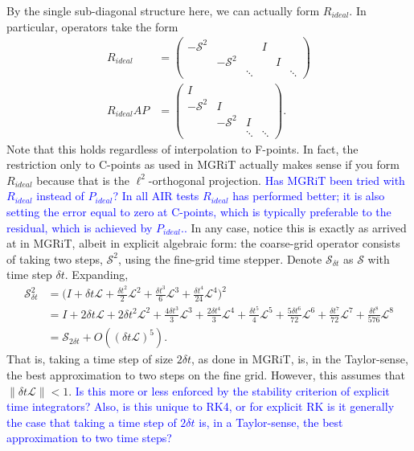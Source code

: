 \documentclass[a4paper,12pt]{article}
\newcommand{\tcb}{\textcolor{blue}}
\begin{document}
By the single sub-diagonal structure here, we can actually form $R_{ideal}$. In particular, operators take the form
%
\begin{align*}
R_{ideal} & = \begin{pmatrix}-\mathcal{S}^2 & & & I & \\ & -\mathcal{S}^2 & & & I \\ & & \ddots & & & \ddots\end{pmatrix} \\
R_{ideal}AP & = \begin{pmatrix} I \\ -\mathcal{S}^2 & I \\ & -\mathcal{S}^2 & I \\ & & \ddots & \ddots \end{pmatrix}.
\end{align*}
%
Note that this holds regardless of interpolation to F-points. In fact, the restriction only to C-points as used in MGRiT actually makes
sense if you form $R_{ideal}$ because that is the $\ell^2$-orthogonal projection. \tcb{Has MGRiT been tried with $R_{ideal}$ instead
of $P_{ideal}$? In all AIR tests $R_{ideal}$ has performed better; it is also setting the error equal to zero at C-points, which is typically preferable
to the residual, which is achieved by $P_{ideal}$..} In any case, notice this is exactly as arrived at in
MGRiT, albeit in explicit algebraic form: the coarse-grid operator consists of taking two steps, $\mathcal{S}^2$, using the fine-grid
time stepper. Denote $\mathcal{S}_{\delta t}$ as $\mathcal{S}$ with time step $\delta t$. Expanding, 
%
\begin{align*}
\mathcal{S}_{\delta t}^2 & = \Big( I + \delta t\mathcal{L} + \tfrac{\delta t^2}{2}\mathcal{L}^2 + \tfrac{\delta t^3}{6}\mathcal{L}^3 +
	\tfrac{\delta t^4}{24}\mathcal{L}^4\Big)^2 \\
& = I + 2 \delta t \mathcal{L} + 2 \delta t^2\mathcal{L}^2 +  \tfrac{4\delta t^3}{3}\mathcal{L}^3 + \tfrac{2\delta t^4}{3}\mathcal{L}^4 + \tfrac{\delta t^5}{4}\mathcal{L}^5 + \tfrac{5\delta t^6}{72}\mathcal{L}^6 + \tfrac{\delta t^7}{72}\mathcal{L}^7 + \tfrac{\delta t^8}{576} \mathcal{L}^8 \\
& = \mathcal{S}_{2\delta t} + O((\delta t\mathcal{L})^5).
\end{align*}
%
That is, taking a time step of size $2\delta t$, as done in MGRiT, is, in the Taylor-sense, the best approximation to two steps on 
the fine grid. However, this assumes that $\|\delta t\mathcal{L}\| < 1$. \tcb{Is this more or less enforced by the stability criterion
of explicit time integrators? Also, is this unique to RK4, or for explicit RK is it generally the case that taking a time step of $2\delta t$
is, in a Taylor-sense, the best approximation to two time steps?}
\end{document}
